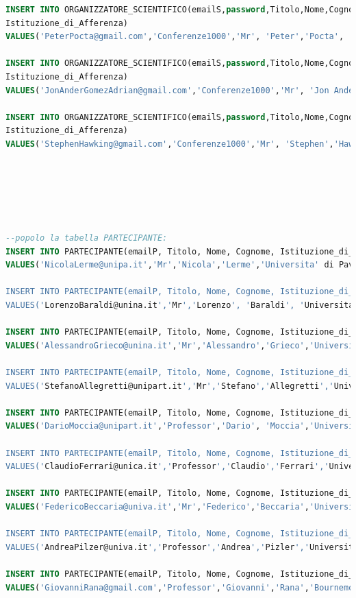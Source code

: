 \documentclass[a4page]{article}
\begin{document}
\begin{lstlisting}[language=SQL,
        deletekeywords={IDENTITY,INT},
        morekeywords={clustered},    
        framesep=10pt,
        framextopmargin=10pt]
INSERT INTO ORGANIZZATORE_SCIENTIFICO(emailS,password,Titolo,Nome,Cognome,
Istituzione_di_Afferenza)
VALUES('PeterPocta@gmail.com','Conferenze1000','Mr', 'Peter','Pocta', 'University of Zilina');

INSERT INTO ORGANIZZATORE_SCIENTIFICO(emailS,password,Titolo,Nome,Cognome,
Istituzione_di_Afferenza)
VALUES('JonAnderGomezAdrian@gmail.com','Conferenze1000','Mr', 'Jon Ander','Gomez Adrian', 'University of Alicante');

INSERT INTO ORGANIZZATORE_SCIENTIFICO(emailS,password,Titolo,Nome,Cognome,
Istituzione_di_Afferenza)
VALUES('StephenHawking@gmail.com','Conferenze1000','Mr', 'Stephen','Hawking', 'University of Cambridge');






--popolo la tabella PARTECIPANTE:
INSERT INTO PARTECIPANTE(emailP, Titolo, Nome, Cognome, Istituzione_di_Afferenza)
VALUES('NicolaLerme@unipa.it','Mr','Nicola','Lerme','Universita' di Pavia');

INSERT INTO PARTECIPANTE(emailP, Titolo, Nome, Cognome, Istituzione_di_Afferenza)
VALUES('LorenzoBaraldi@unina.it','Mr','Lorenzo', 'Baraldi', 'Universita' degli Studi di Napoli Federico II');

INSERT INTO PARTECIPANTE(emailP, Titolo, Nome, Cognome, Istituzione_di_Afferenza)
VALUES('AlessandroGrieco@unina.it','Mr','Alessandro','Grieco','Universita' degli Studi di Napoli Federico II');

INSERT INTO PARTECIPANTE(emailP, Titolo, Nome, Cognome, Istituzione_di_Afferenza)
VALUES('StefanoAllegretti@unipart.it','Mr','Stefano','Allegretti','Universita' Parthenope');

INSERT INTO PARTECIPANTE(emailP, Titolo, Nome, Cognome, Istituzione_di_Afferenza)
VALUES('DarioMoccia@unipart.it','Professor','Dario', 'Moccia','Universita' Parthenope');

INSERT INTO PARTECIPANTE(emailP, Titolo, Nome, Cognome, Istituzione_di_Afferenza)
VALUES('ClaudioFerrari@unica.it','Professor','Claudio','Ferrari','Universita' di Catania');

INSERT INTO PARTECIPANTE(emailP, Titolo, Nome, Cognome, Istituzione_di_Afferenza)
VALUES('FedericoBeccaria@univa.it','Mr','Federico','Beccaria','Universita' Vanvitelli');

INSERT INTO PARTECIPANTE(emailP, Titolo, Nome, Cognome, Istituzione_di_Afferenza)
VALUES('AndreaPilzer@univa.it','Professor','Andrea','Pizler','Universita' Vanvitelli');

INSERT INTO PARTECIPANTE(emailP, Titolo, Nome, Cognome, Istituzione_di_Afferenza)
VALUES('GiovanniRana@gmail.com','Professor','Giovanni','Rana','Bournemouth University');


\end{lstlisting}
\end{document}
